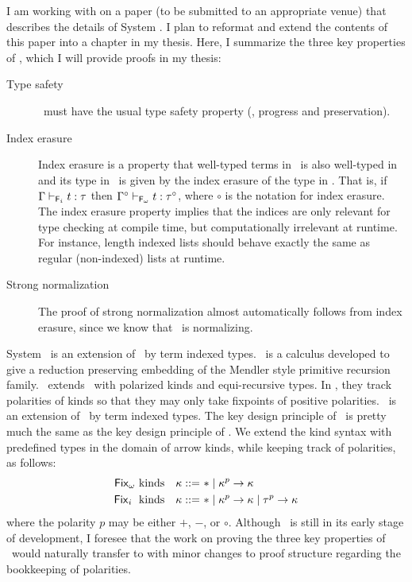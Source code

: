 I am working with on a paper (to be submitted to an appropriate venue) that
describes the details of System \Fi. I plan to reformat and extend
the contents of this paper into a chapter in my thesis. Here, I summarize
the three key properties of \Fi, which I will provide proofs in my thesis:
\begin{description}
\item[\quad Type safety]
\Fi\ must have the usual type safety property (\ie, progress and preservation).

\item[\quad Index erasure]
Index erasure is a property that well-typed terms in \Fi\ is also 
well-typed in \Fw\, and its type in \Fw\ is given by the index erasure
of the type in \Fi. That is, if $\Gamma |-_{\mathsf{F}_i} t : \tau$ then
$\Gamma^\circ |-_{\mathsf{F}_\omega} t : \tau^\circ$, where $\circ$ is the notation
for index erasure. The index erasure property implies that the indices are
only relevant for type checking at compile time, but computationally irrelevant
at runtime. For instance, length indexed lists should behave exactly the same as
regular (non-indexed) lists at runtime.

\item[\quad Strong normalization]
The proof of strong normalization almost automatically follows from
index erasure, since we know that \Fw\ is normalizing.
\end{description}

System \Fixi\ is an extension of \Fixw\ by term indexed types.
\Fixw\ is a calculus developed to give a reduction preserving embedding of
the Mendler style primitive recursion family. \Fixw\ extends \Fw\ with
polarized kinds and equi-recursive types. In \Fixi, they track polarities of
kinds so that they may only take fixpoints of positive polarities.
\Fixi\ is an extension of \Fixw\ by term indexed types. The key design principle
of \Fixi\ is pretty much the same as the key design principle of \Fi.
We extend the kind syntax with predefined types in the domain of arrow kinds,
while keeping track of polarities, as follows:
\begin{align*}
\text{\ensuremath{\mathsf{Fix}_\omega}\ kinds} ~~~ \kappa ::= ~ & * \mid \kappa^p -> \kappa \\
\text{\ensuremath{\mathsf{Fix}_i}\; kinds}~~~ \kappa ::= ~ & * \mid \kappa^p -> \kappa \mid \tau^p -> \kappa
\end{align*}
where the polarity $p$ may be either $+$, $-$, or $\circ$.
Although \Fixi\ is still in its early stage of development, I foresee that
the work on proving the three key properties of \Fi\ would
naturally transfer to \Fixi with minor changes to proof structure
regarding the bookkeeping of polarities.

